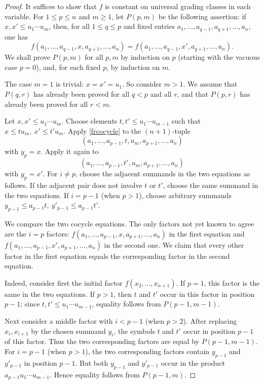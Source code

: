 \documentclass[12pt]{amsart}
\numberwithin{equation}{section}
\theoremstyle{definition}
\newcommand{\1}{_{(1)}}
\newcommand{\2}{_{(2)}}
\newcommand{\3}{_{(3)}}
\newcommand{\4}{_{(4)}}
\newcommand{\5}{_{(5)}}
\newcommand{\6}{_{(6)}}
\theoremstyle{plain}
\theoremstyle{definition}
\theoremstyle{remark}
\begin{document}
\begin{proof} It suffices to show that $f$ is constant on universal grading classes in each variable.  For
$1\le p\le n$ and $m\ge 1$, let $P(p,m)$ be the following assertion: if
$x,x'\le u_1\cdots u_m$, then, for all $1\le q\le p$ and fixed entries
$a_1,\ldots,a_{q-1},a_{q+1},\ldots,a_n$, one has
\begin{equation*}
        f(a_1,\ldots,a_{q-1},x,a_{q+1},\ldots,a_n)
        =
        f(a_1,\ldots,a_{q-1},x',a_{q+1},\ldots,a_n).
\end{equation*}
We shall prove $P(p,m)$ for all $p,m$ by induction on $p$ (starting with the vacuous case $p=0$), and, for each fixed $p$, by induction on $m$.

The case $m=1$ is trivial: $x=x'=u_1$.  So consider $m>1$.  
We assume that $P(q,r)$ has already been proved for all
$q<p$ and all $r$, and that $P(p,r)$ has already been proved for all $r<m$.  

Let
$x,x'\le u_1\cdots u_m$.  Choose elements
$t,t'\le u_1\cdots u_{m-1}$ such that
$
        x\le tu_m,
        \ 
        x'\le t'u_m .
$
Apply \eqref{frcocycle} to the $(n+1)$-tuple
$$
        (a_1,\ldots,a_{p-1},t,u_m,a_{p+1},\ldots,a_n)
$$
with $y_{p}=x$.  Apply it again to
$$
        (a_1,\ldots,a_{p-1},t',u_m,a_{p+1},\ldots,a_n)
$$
with $y_{p}=x'$.  For $i\ne p$, choose the adjacent summands in the two equations as follows.  If the adjacent pair does not involve $t$ or $t'$, choose the same summand in the two equations.  If $i=p-1$ (when $p>1$), choose arbitrary summands $
        y_{p-1}\le a_{p-1}t,
        \ 
        y'_{p-1}\le a_{p-1}t'.
$


We compare the two cocycle equations. The only factors not yet known to agree are the \(i=p\) factors:
$f(a_1,\ldots,a_{p-1},x,a_{p+1},\ldots,a_n)$
in the first equation and
$
        f(a_1,\ldots,a_{p-1},x',a_{p+1},\ldots,a_n)
$
in the second one.  We claim that every other factor in the first equation equals the corresponding factor in the second equation.

Indeed, consider first the initial factor $f(x_2,\ldots,x_{n+1})$.
If $p=1$, this factor is the same in the two equations.  If $p>1$, then $t$ and $t'$ occur in this factor in position $p-1$; since $t,t'\le u_1\cdots u_{m-1}$, equality follows from $P(p-1,m-1)$.

Next consider a middle factor with $i<p-1$ (when $p>2$).  After replacing $x_i,x_{i+1}$ by the chosen summand $y_i$, the symbols $t$ and $t'$ occur in position $p-1$ of this factor.  Thus the two corresponding factors are equal by $P(p-1,m-1)$.  For $i=p-1$ (when $p>1$), the two corresponding factors contain $y_{p-1}$ and $y'_{p-1}$ in position $p-1$.  But both $y_{p-1}$ and $y'_{p-1}$ occur in the product
$a_{p-1}u_1\cdots u_{m-1}$.
Hence equality follows from $P(p-1,m)$.


\end{proof}
\end{document}
